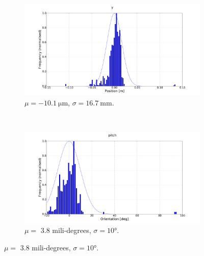 \begin{figure}
  \begin{subfigure}{0.48\textwidth}
     \includegraphics[clip, trim = 120 0 120 0, width=\textwidth]{figures/chapter3/norm_y}
     \caption{$\mu = \SI{-10.1}{\micro \m}$, $\sigma = \SI{16.7}{\mm}$.}
  \label{fig:norm-y}
  \end{subfigure}
~
  \begin{subfigure}{0.48\textwidth}
     \includegraphics[clip, trim = 120 0 120 0, width=\textwidth]{figures/chapter3/norm_pitch.pdf}
     \caption{$\mu = $ 3.8 mili-degrees, $\sigma = \ang{10}$.}
  \label{fig:norm-pitch}
  \end{subfigure}


\end{figure}
